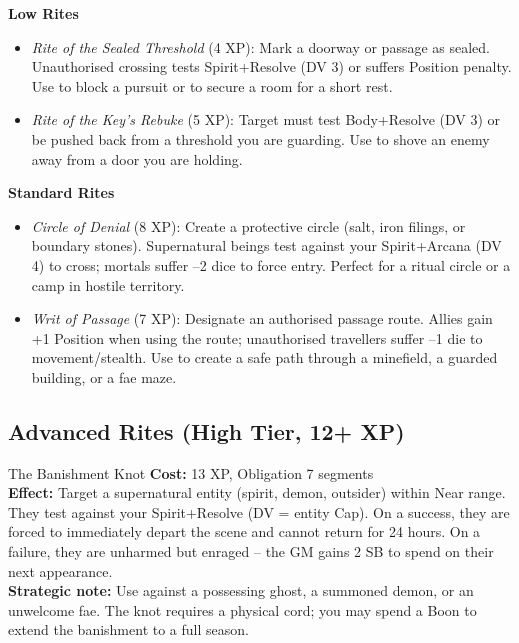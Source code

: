 \documentclass[10pt,a5paper]{book}
\begin{document}
\textbf{Low Rites}
\begin{itemize}
    \item \textit{Rite of the Sealed Threshold} (4 XP): Mark a doorway or passage as sealed. Unauthorised crossing tests Spirit+Resolve (DV 3) or suffers Position penalty. Use to block a pursuit or to secure a room for a short rest.
    \item \textit{Rite of the Key’s Rebuke} (5 XP): Target must test Body+Resolve (DV 3) or be pushed back from a threshold you are guarding. Use to shove an enemy away from a door you are holding.
\end{itemize}

\textbf{Standard Rites}
\begin{itemize}
    \item \textit{Circle of Denial} (8 XP): Create a protective circle (salt, iron filings, or boundary stones). Supernatural beings test against your Spirit+Arcana (DV 4) to cross; mortals suffer –2 dice to force entry. Perfect for a ritual circle or a camp in hostile territory.
    \item \textit{Writ of Passage} (7 XP): Designate an authorised passage route. Allies gain +1 Position when using the route; unauthorised travellers suffer –1 die to movement/stealth. Use to create a safe path through a minefield, a guarded building, or a fae maze.
\end{itemize}

\subsection*{Advanced Rites (High Tier, 12+ XP)}

\begin{patronbox}{The Banishment Knot}
\textbf{Cost:} 13 XP, Obligation 7 segments \\
\textbf{Effect:} Target a supernatural entity (spirit, demon, outsider) within Near range. They test against your Spirit+Resolve (DV = entity Cap). On a success, they are forced to immediately depart the scene and cannot return for 24 hours. On a failure, they are unharmed but enraged – the GM gains 2 SB to spend on their next appearance. \\
\textbf{Strategic note:} Use against a possessing ghost, a summoned demon, or an unwelcome fae. The knot requires a physical cord; you may spend a Boon to extend the banishment to a full season.
\end{patronbox}
\end{document}
